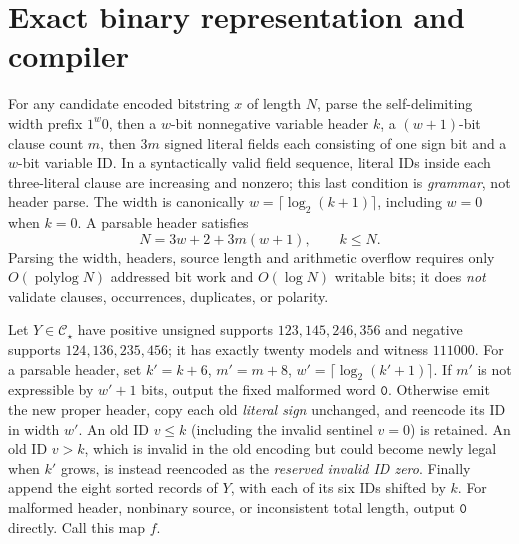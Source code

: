 \documentclass[11pt]{article}
\newcommand{\CS}{\mathcal C_\star}
\begin{document}
\section{Exact binary representation and compiler}
For any candidate encoded bitstring \(x\) of length \(N\), parse the self-delimiting width prefix \(1^w0\), then a \(w\)-bit nonnegative variable header \(k\), a \((w+1)\)-bit clause count \(m\), then \(3m\) signed literal fields each consisting of one sign bit and a \(w\)-bit variable ID. In a syntactically valid field sequence, literal IDs inside each three-literal clause are increasing and nonzero; this last condition is \emph{grammar}, not header parse. The width is canonically \(w=\lceil\log_2(k+1)\rceil\), including \(w=0\) when \(k=0\). A parsable header satisfies
\[
N=3w+2+3m(w+1),\qquad k\le N.
\]
Parsing the width, headers, source length and arithmetic overflow requires only \(O(\operatorname{polylog}N)\) addressed bit work and \(O(\log N)\) writable bits; it does \emph{not} validate clauses, occurrences, duplicates, or polarity.

Let \(Y\in\CS\) have positive unsigned supports \(123,145,246,356\) and negative supports \(124,136,235,456\); it has exactly twenty models and witness \(111000\). For a parsable header, set \(k'=k+6\), \(m'=m+8\), \(w'=\lceil\log_2(k'+1)\rceil\). If \(m'\) is not expressible by \(w'+1\) bits, output the fixed malformed word \(\texttt{0}\). Otherwise emit the new proper header, copy each old \emph{literal sign} unchanged, and reencode its ID in width \(w'\). An old ID \(v\le k\) (including the invalid sentinel \(v=0\)) is retained. An old ID \(v>k\), which is invalid in the old encoding but could become newly legal when \(k'\) grows, is instead reencoded as the \emph{reserved invalid ID zero}. Finally append the eight sorted records of \(Y\), with each of its six IDs shifted by \(k\). For malformed header, nonbinary source, or inconsistent total length, output \(\texttt{0}\) directly. Call this map \(f\).
\end{document}
